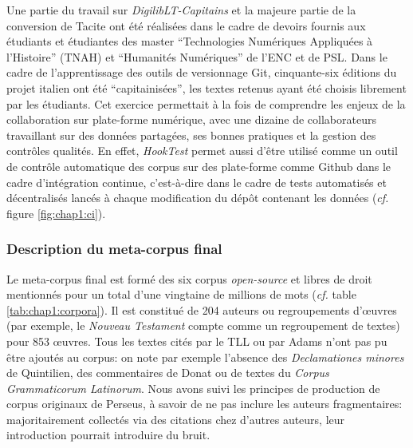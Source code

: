 Une partie du travail sur \textit{DigilibLT-Capitains} et la majeure partie de la conversion de Tacite ont été réalisées dans le cadre de devoirs fournis aux étudiants et étudiantes des master \enquote{Technologies Numériques Appliquées à l'Histoire} (TNAH) et \enquote{Humanités Numériques} de l'ENC et de PSL. Dans le cadre de l'apprentissage des outils de versionnage Git, cinquante-six éditions du projet italien ont été \enquote{capitainisées}, les textes retenus ayant été choisis librement par les étudiants. Cet exercice permettait à la fois de comprendre les enjeux de la collaboration sur plate-forme numérique, avec une dizaine de collaborateurs travaillant sur des données partagées, ses bonnes pratiques et la gestion des contrôles qualités. En effet, \textit{HookTest} permet aussi d'être utilisé comme un outil de contrôle automatique des corpus sur des plate-forme comme Github dans le cadre d'intégration continue, c'est-à-dire dans le cadre de tests automatisés et décentralisés lancés à chaque modification du dépôt contenant les données (\textit{cf.} figure \ref{fig:chap1:ci}).

    
\subsubsection{Description du meta-corpus final}

Le meta-corpus final est formé des six corpus \textit{open-source} et libres de droit mentionnés pour un total d'une vingtaine de millions de mots (\textit{cf.} table \ref{tab:chap1:corpora}). Il est constitué de 204 auteurs ou regroupements d'œuvres (par exemple, le \textit{Nouveau Testament} compte comme un regroupement de textes) pour 853 œuvres. Tous les textes cités par le TLL ou par Adams n'ont pas pu être ajoutés au corpus: on note par exemple l'absence des \textit{Declamationes minores} de Quintilien, des commentaires de Donat ou de textes du \textit{Corpus Grammaticorum Latinorum}. Nous avons suivi les principes de production de corpus originaux de Perseus, à savoir de ne pas inclure les auteurs fragmentaires: majoritairement collectés via des citations chez d'autres auteurs, leur introduction pourrait introduire du bruit. 

